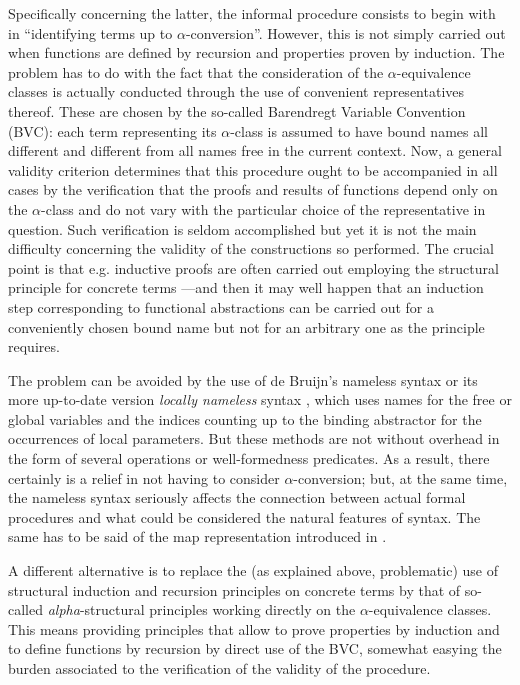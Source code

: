 \documentclass{entcs}
\begin{document}
Specifically concerning the latter, the informal procedure consists to begin with in ``identifying terms up to $\alpha$-conversion''. However, this is not simply carried out when functions are defined by recursion and properties proven by induction. The problem has to do with the fact that the consideration of the $\alpha$-equivalence classes is actually conducted through the use of convenient representatives thereof. These are chosen by the so-called Barendregt Variable Convention (BVC): each term representing its $\alpha$-class is assumed to have bound names all different and different from all names free in the current context. Now, a general validity criterion determines that this procedure ought to be accompanied in all cases by the verification that the proofs and results of functions depend only on the $\alpha$-class and do not vary with the particular choice of the representative in question. Such verification is seldom accomplished but yet it is not the main difficulty concerning the validity of the constructions so performed. The crucial point is that e.g. inductive proofs are often carried out employing the structural principle for concrete terms ---and then it may well happen that an induction step corresponding to functional abstractions can be carried out for a conveniently chosen bound name but not for an arbitrary one as the principle requires.

The problem can be avoided by the use of de Bruijn's nameless syntax \cite{deBruijn1972} or its more up-to-date version \textit{locally nameless} syntax \cite{aydemir08,chargueraud12}, which uses names for the free or global variables and the indices counting up to the binding abstractor for the occurrences of local parameters. But these methods are not without overhead in the form of  several operations or well-formedness predicates.
As a result, there certainly is a relief in not having to consider $\alpha$-conversion; but, at the same time, the nameless syntax seriously affects the connection between actual formal procedures and what could be considered the natural features of syntax.
The same has to be said of the map representation introduced in \cite{sato}.

A different alternative is to replace the (as explained above, problematic) use of structural induction and recursion principles on concrete terms by that of so-called \emph{alpha}-structural principles working directly on the $\alpha$-equivalence classes. This means providing principles that allow to prove properties by induction and to define functions by recursion by direct use of the BVC, somewhat easying the burden associated to the verification of the validity of the procedure.
\end{document}
